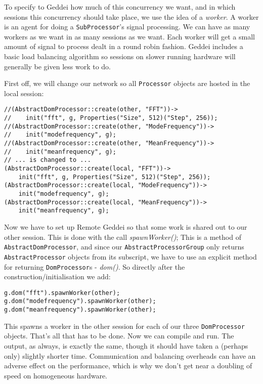 To specify to Geddei how much of this concurrency we want, and in which sessions this concurrency should take place, we use the idea of a \textit{worker}. A worker is an agent for doing a \texttt{SubProcessor}'s signal processing. We can have as many workers as we want in as many sessions as we want. Each worker will get a small amount of signal to process dealt in a round robin fashion. Geddei includes a basic load balancing algorithm so sessions on slower running hardware will generally be given less work to do.

First off, we will change our network so all \texttt{Processor} objects are hosted in the local session:

\begin{verbatim}
//(AbstractDomProcessor::create(other, "FFT"))->
//    init("fft", g, Properties("Size", 512)("Step", 256));
//(AbstractDomProcessor::create(other, "ModeFrequency"))->
//    init("modefrequency", g);
//(AbstractDomProcessor::create(other, "MeanFrequency"))->
//    init("meanfrequency", g);
// ... is changed to ...
(AbstractDomProcessor::create(local, "FFT"))->
    init("fft", g, Properties("Size", 512)("Step", 256));
(AbstractDomProcessor::create(local, "ModeFrequency"))->
    init("modefrequency", g);
(AbstractDomProcessor::create(local, "MeanFrequency"))->
    init("meanfrequency", g);
\end{verbatim}

Now we have to set up Remote Geddei so that some work is shared out to our other session. This is done with the call \textit{spawnWorker()}; This is a method of \texttt{AbstractDomProcessor}, and since our \texttt{AbstractProcessorGroup} only returns \texttt{AbstractProcessor} objects from its subscript, we have to use an explicit method for returning \texttt{DomProcessor}s - \textit{dom()}. So directly after the construction/initialisation we add:

\begin{verbatim}
g.dom("fft").spawnWorker(other);
g.dom("modefrequency").spawnWorker(other);
g.dom("meanfrequency").spawnWorker(other);
\end{verbatim}

This spawns a worker in the other session for each of our three \texttt{DomProcessor} objects. That's all that has to be done. Now we can compile and run. The output, as always, is exactly the same, though it should have taken a (perhaps only) slightly shorter time. Communication and balancing overheads can have an adverse effect on the performance, which is why we don't get near a doubling of speed on homogeneous hardware.




